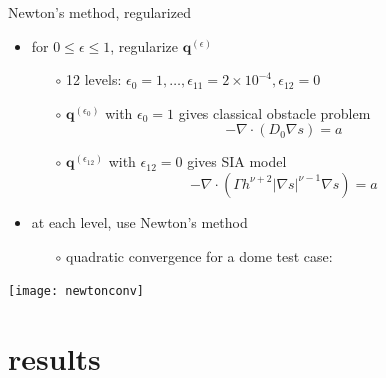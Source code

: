 \documentclass[xcolor={dvipsnames}]{beamer}
\newcommand\bq{\mathbf{q}}
\newcommand\Div{\nabla\cdot}
\newcommand\eps{\epsilon}
\newcommand\grad{\nabla}
\begin{document}
\begin{frame}{Newton's method, regularized}

\begin{itemize}
\item for $0 \le \eps \le 1$, regularize $\bq^{(\eps)}$
  \begin{itemize}
  \item[$\circ$] 12 levels: $\eps_0=1, \dots, \eps_{11}=2\times 10^{-4}, \eps_{12}=0$
  \item[$\circ$] $\bq^{(\eps_0)}$ with $\eps_0=1$ gives classical obstacle problem
    $$- \Div (D_0 \grad s) = a$$
  \item[$\circ$] $\bq^{(\eps_{12})}$ with $\eps_{12}=0$ gives SIA model
    $$- \Div (\Gamma h^{\nu+2} |\grad s|^{\nu-1} \grad s) = a$$
  \end{itemize}
\item at each level, use Newton's method
  \begin{itemize}
  \item[$\circ$] quadratic convergence for a dome test case:
  \end{itemize}
\end{itemize}

\begin{center}
\texttt{[image: newtonconv]}
\end{center}
\end{frame}


\section{results}
\end{document}
